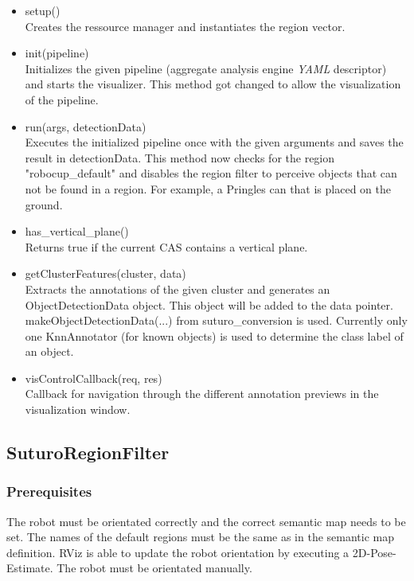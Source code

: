 \documentclass[main.tex]{subfiles}
\begin{document}
\begin{itemize}
\item setup()\\
Creates the ressource manager and instantiates the region vector.

\item init(pipeline)\\
Initializes the given pipeline (aggregate analysis engine \textit{YAML} descriptor) and starts the visualizer.
This method got changed to allow the visualization of the pipeline.

\item run(args, detectionData)\\
Executes the initialized pipeline once with the given arguments and saves the result in detectionData.
This method now checks for the region "robocup\_default" and disables the region filter to perceive objects that can not be found
in a region. For example, a Pringles can that is placed on the ground.

\item has\_vertical\_plane()\\
Returns true if the current CAS contains a vertical plane.

\item getClusterFeatures(cluster, data)\\
Extracts the annotations of the given cluster and generates an ObjectDetectionData object. 
This object will be added to the data pointer. makeObjectDetectionData(...) from suturo\_conversion is used.
Currently only one KnnAnnotator (for known objects) is used to determine the class label of an object.

\item visControlCallback(req, res)\\
Callback for navigation through the different annotation previews in the visualization window.
\end{itemize}

\subsection{SuturoRegionFilter}
\subsubsection{Prerequisites}
The robot must be orientated correctly and the correct semantic map needs to be set.
The names of the default regions must be the same as in the semantic map definition.
RViz is able to update the robot orientation by executing a 2D-Pose-Estimate. The robot must be orientated manually.
\end{document}
